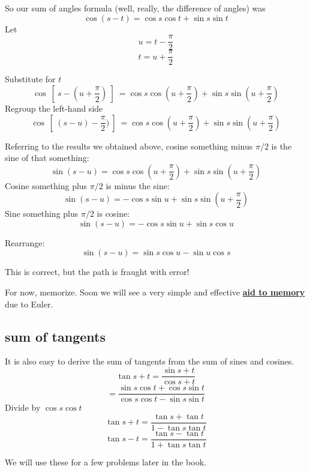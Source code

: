\documentclass[11pt, oneside]{article}
\begin{document}
So our sum of angles formula (well, really, the difference of angles) was
\[ \cos (s - t) = \cos s \cos t + \sin s \sin t \]
Let
\[ u = t - \frac{\pi}{2} \]
\[ t  = u + \frac{\pi}{2} \]

Substitute for $t$
\[ \cos \ [ \ s - (u + \frac{\pi}{2}) \ ] \ = \cos s \cos (u + \frac{\pi}{2}) + \sin s \sin (u + \frac{\pi}{2}) \]
Regroup the left-hand side
\[ \cos \ [ \ (s - u) - \frac{\pi}{2}) \ ] \ = \cos s \cos (u + \frac{\pi}{2}) + \sin s \sin (u + \frac{\pi}{2}) \]

Referring to the results we obtained above, cosine something minus $\pi/2$ is the sine of that something:
\[ \sin (s - u) = \cos s \cos (u + \frac{\pi}{2}) + \sin s \sin (u + \frac{\pi}{2}) \]
Cosine something plus $\pi/2$ is minus the sine:
\[ \sin (s - u) = -\cos s \sin u + \sin s \sin (u + \frac{\pi}{2}) \]
Sine something plus $\pi/2$ is cosine:
\[ \sin (s - u) = -\cos s \sin u + \sin s \cos u \]

Rearrange:
\[ \sin (s - u) = \sin s \cos u - \sin u \cos s \]

This is correct, but the path is fraught with error!  

For now, memorize. Soon we will see a very simple and effective \hyperref[sec:Euler_sum_angles]{\textbf{aid to memory}} due to Euler.

\subsection*{sum of tangents}

It is also easy to derive the sum of tangents from the sum of sines and cosines.
\[ \tan s + t = \frac{\sin s + t}{\cos s + t} \]
\[ = \frac{\sin s \cos t + \cos s \sin t}{\cos s \cos t - \sin s \sin t} \]
Divide by $\cos s \cos t$
\[ \tan s + t = \frac{\tan s + \tan t}{1 - \tan s \tan t} \]
\[ \tan s - t = \frac{\tan s - \tan t}{1 + \tan s \tan t} \]

We will use these for a few problems later in the book.
\end{document}
